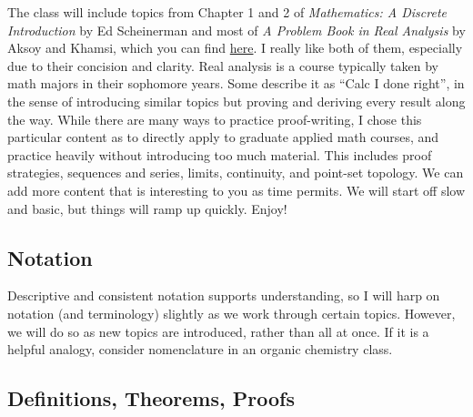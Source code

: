 \documentclass[11pt]{article}
\theoremstyle{plain}
\theoremstyle{definition}
\theoremstyle{remark}
\begin{document}
The class will include topics from Chapter 1 and 2 of {\it Mathematics: A Discrete Introduction} by Ed Scheinerman and most of {\it A Problem Book in Real Analysis} by Aksoy and Khamsi, which you can find \href{https://drive.google.com/drive/folders/1T_M-dvYE4leOSmpKt2eGYOvPRch_SDpK?usp=sharing}{here}. I really like both of them, especially due to their concision and clarity. Real analysis  is a course typically taken by math majors in their sophomore years. Some describe it as “Calc I done right”, in the sense of introducing similar topics but proving and deriving every result along the way. While there are many ways to practice proof-writing, I chose this particular content as to directly apply to graduate applied math courses, and practice heavily without introducing too much material. This includes proof strategies, sequences and series, limits, continuity, and point-set topology. We can add more content that is interesting to you as time permits. We will start off slow and basic, but things will ramp up quickly. Enjoy!

\subsection{Notation}

Descriptive and consistent notation supports understanding, so I will harp on notation (and terminology) slightly as we work through certain topics. However, we will do so as new topics are introduced, rather than all at once. If it is a helpful analogy, consider nomenclature in an organic chemistry class.

\subsection{Definitions, Theorems, Proofs}
\end{document}

